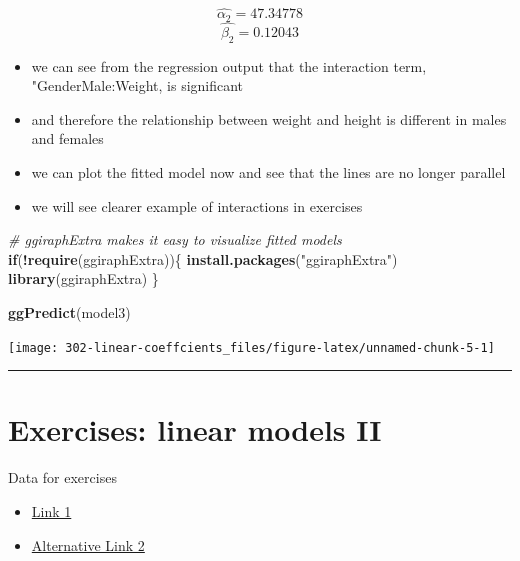 \documentclass[
]{book}
\newenvironment{Shaded}{\begin{snugshade}}{\end{snugshade}}
\newcommand{\CommentTok}[1]{\textcolor[rgb]{0.56,0.35,0.01}{\textit{#1}}}
\newcommand{\ControlFlowTok}[1]{\textcolor[rgb]{0.13,0.29,0.53}{\textbf{#1}}}
\newcommand{\KeywordTok}[1]{\textcolor[rgb]{0.13,0.29,0.53}{\textbf{#1}}}
\newcommand{\NormalTok}[1]{#1}
\newcommand{\OperatorTok}[1]{\textcolor[rgb]{0.81,0.36,0.00}{\textbf{#1}}}
\newcommand{\StringTok}[1]{\textcolor[rgb]{0.31,0.60,0.02}{#1}}
\providecommand{\tightlist}{%
  \setlength{\itemsep}{0pt}\setlength{\parskip}{0pt}}
\theoremstyle{definition}
\theoremstyle{definition}
\theoremstyle{definition}
\theoremstyle{remark}
\begin{document}
\[\hat{\alpha_2} = 47.34778\]
\[\hat{\beta_2} = 0.12043\]

\begin{itemize}
\tightlist
\item
  we can see from the regression output that the interaction term, "GenderMale:Weight, is significant
\item
  and therefore the relationship between weight and height is different in males and females
\item
  we can plot the fitted model now and see that the lines are no longer parallel
\item
  we will see clearer example of interactions in exercises
\end{itemize}

\begin{Shaded}
\begin{Highlighting}[]
\CommentTok{\# ggiraphExtra makes it easy to visualize fitted models}
\ControlFlowTok{if}\NormalTok{(}\OperatorTok{!}\KeywordTok{require}\NormalTok{(ggiraphExtra))\{}
    \KeywordTok{install.packages}\NormalTok{(}\StringTok{"ggiraphExtra"}\NormalTok{)}
    \KeywordTok{library}\NormalTok{(ggiraphExtra)}
\NormalTok{\}}

\KeywordTok{ggPredict}\NormalTok{(model3)}
\end{Highlighting}
\end{Shaded}

\begin{center}\texttt{[image: 302-linear-coeffcients\_files/figure-latex/unnamed-chunk-5-1]} \end{center}

\begin{center}\rule{0.5\linewidth}{0.5pt}\end{center}

\hypertarget{exercises-linear-models-ii}{%
\section{Exercises: linear models II}\label{exercises-linear-models-ii}}

Data for exercises

\begin{itemize}
\tightlist
\item
  \href{https://github.com/olgadet/bookdown-mlbiostatistics/tree/master/data/lm/data.zip}{Link 1}
\item
  \href{https://stockholmuniversity.box.com/s/z5kwg0nlwe5la4h5t8bshpj57pylif14}{Alternative Link 2}
\end{itemize}
\end{document}
